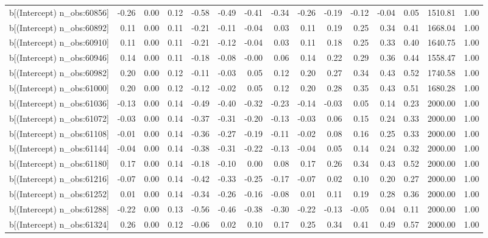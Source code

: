\begin{table}[ht]
\begin{tabular}{rrrrrrrrrrrrrrr}
  b[(Intercept) n\_obs:60856] & -0.26 & 0.00 & 0.12 & -0.58 & -0.49 & -0.41 & -0.34 & -0.26 & -0.19 & -0.12 & -0.04 & 0.05 & 1510.81 & 1.00 \\ 
  b[(Intercept) n\_obs:60892] & 0.11 & 0.00 & 0.11 & -0.21 & -0.11 & -0.04 & 0.03 & 0.11 & 0.19 & 0.25 & 0.34 & 0.41 & 1668.04 & 1.00 \\ 
  b[(Intercept) n\_obs:60910] & 0.11 & 0.00 & 0.11 & -0.21 & -0.12 & -0.04 & 0.03 & 0.11 & 0.18 & 0.25 & 0.33 & 0.40 & 1640.75 & 1.00 \\ 
  b[(Intercept) n\_obs:60946] & 0.14 & 0.00 & 0.11 & -0.18 & -0.08 & -0.00 & 0.06 & 0.14 & 0.22 & 0.29 & 0.36 & 0.44 & 1558.47 & 1.00 \\ 
  b[(Intercept) n\_obs:60982] & 0.20 & 0.00 & 0.12 & -0.11 & -0.03 & 0.05 & 0.12 & 0.20 & 0.27 & 0.34 & 0.43 & 0.52 & 1740.58 & 1.00 \\ 
  b[(Intercept) n\_obs:61000] & 0.20 & 0.00 & 0.12 & -0.12 & -0.02 & 0.05 & 0.12 & 0.20 & 0.28 & 0.35 & 0.43 & 0.51 & 1680.28 & 1.00 \\ 
  b[(Intercept) n\_obs:61036] & -0.13 & 0.00 & 0.14 & -0.49 & -0.40 & -0.32 & -0.23 & -0.14 & -0.03 & 0.05 & 0.14 & 0.23 & 2000.00 & 1.00 \\ 
  b[(Intercept) n\_obs:61072] & -0.03 & 0.00 & 0.14 & -0.37 & -0.31 & -0.20 & -0.13 & -0.03 & 0.06 & 0.15 & 0.24 & 0.33 & 2000.00 & 1.00 \\ 
  b[(Intercept) n\_obs:61108] & -0.01 & 0.00 & 0.14 & -0.36 & -0.27 & -0.19 & -0.11 & -0.02 & 0.08 & 0.16 & 0.25 & 0.33 & 2000.00 & 1.00 \\ 
  b[(Intercept) n\_obs:61144] & -0.04 & 0.00 & 0.14 & -0.38 & -0.31 & -0.22 & -0.13 & -0.04 & 0.05 & 0.14 & 0.24 & 0.32 & 2000.00 & 1.00 \\ 
  b[(Intercept) n\_obs:61180] & 0.17 & 0.00 & 0.14 & -0.18 & -0.10 & 0.00 & 0.08 & 0.17 & 0.26 & 0.34 & 0.43 & 0.52 & 2000.00 & 1.00 \\ 
  b[(Intercept) n\_obs:61216] & -0.07 & 0.00 & 0.14 & -0.42 & -0.33 & -0.25 & -0.17 & -0.07 & 0.02 & 0.10 & 0.20 & 0.27 & 2000.00 & 1.00 \\ 
  b[(Intercept) n\_obs:61252] & 0.01 & 0.00 & 0.14 & -0.34 & -0.26 & -0.16 & -0.08 & 0.01 & 0.11 & 0.19 & 0.28 & 0.36 & 2000.00 & 1.00 \\ 
  b[(Intercept) n\_obs:61288] & -0.22 & 0.00 & 0.13 & -0.56 & -0.46 & -0.38 & -0.30 & -0.22 & -0.13 & -0.05 & 0.04 & 0.11 & 2000.00 & 1.00 \\ 
  b[(Intercept) n\_obs:61324] & 0.26 & 0.00 & 0.12 & -0.06 & 0.02 & 0.10 & 0.17 & 0.25 & 0.34 & 0.41 & 0.49 & 0.57 & 2000.00 & 1.00 \\ 

\end{tabular}
\end{table}
